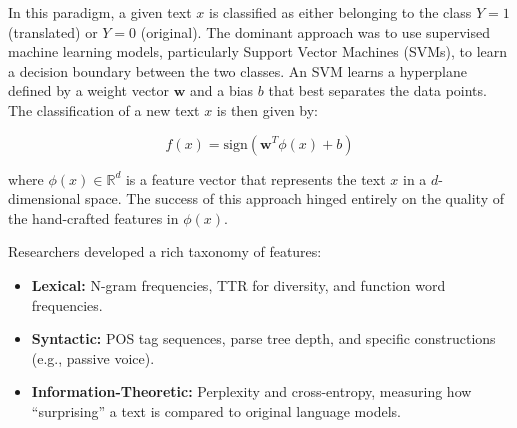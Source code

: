 \documentclass[11pt,a4paper]{article}
\begin{document}
In this paradigm, a given text $x$ is classified as either belonging to the class $Y=1$ (translated) or $Y=0$ (original). The dominant approach was to use supervised machine learning models, particularly Support Vector Machines (SVMs), to learn a decision boundary between the two classes. An SVM learns a hyperplane defined by a weight vector $\mathbf{w}$ and a bias $b$ that best separates the data points. The classification of a new text $x$ is then given by:

$$ f(x) = \text{sign}(\mathbf{w}^T \phi(x) + b) $$

where $\phi(x) \in \mathbb{R}^d$ is a feature vector that represents the text $x$ in a $d$-dimensional space. The success of this approach hinged entirely on the quality of the hand-crafted features in $\phi(x)$.

Researchers developed a rich taxonomy of features:

\begin{itemize}
    \item \textbf{Lexical:} N-gram frequencies, TTR for diversity, and function word frequencies.
    \item \textbf{Syntactic:} POS tag sequences, parse tree depth, and specific constructions (e.g., passive voice).
    \item \textbf{Information-Theoretic:} Perplexity and cross-entropy, measuring how ``surprising'' a text is compared to original language models.
\end{itemize}
\end{document}
